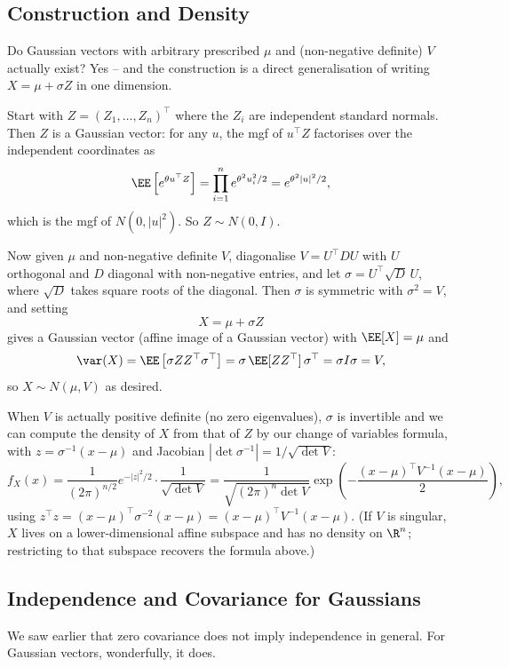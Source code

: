 \subsection{Construction and Density}

Do Gaussian vectors with arbitrary prescribed $\mu$ and (non-negative definite) $V$ actually exist? Yes -- and the construction is a direct generalisation of writing $X = \mu + \sigma Z$ in one dimension.

Start with $Z = (Z_1, \dots, Z_n)^\top$ where the $Z_i$ are independent standard normals. Then $Z$ is a Gaussian vector: for any $u$, the mgf of $u^\top Z$ factorises over the independent coordinates as
$$
\EE\left[e^{\theta u^\top Z}\right] = \prod_{i = 1}^{n} e^{\theta^2 u_i^2 / 2} = e^{\theta^2 |u|^2/2},
$$
which is the mgf of $N(0, |u|^2)$. So $Z \sim N(0, I)$.

Now given $\mu$ and non-negative definite $V$, diagonalise $V = U^\top D U$ with $U$ orthogonal and $D$ diagonal with non-negative entries, and let $\sigma = U^\top \sqrt{D}\, U$, where $\sqrt{D}$ takes square roots of the diagonal. Then $\sigma$ is symmetric with $\sigma^2 = V$, and setting
$$
X = \mu + \sigma Z
$$
gives a Gaussian vector (affine image of a Gaussian vector) with $\EE[X] = \mu$ and
$$
\var(X) = \EE\left[\sigma Z Z^\top \sigma^\top\right] = \sigma\, \EE[ZZ^\top]\, \sigma^\top = \sigma I \sigma = V,
$$
so $X \sim N(\mu, V)$ as desired.

When $V$ is actually positive definite (no zero eigenvalues), $\sigma$ is invertible and we can compute the density of $X$ from that of $Z$ by our change of variables formula, with $z = \sigma^{-1}(x - \mu)$ and Jacobian $|\det \sigma^{-1}| = 1/\sqrt{\det V}$:
$$
f_X(x) = \frac{1}{(2\pi)^{n/2}}e^{-|z|^2/2}\cdot\frac{1}{\sqrt{\det V}} = \frac{1}{\sqrt{(2\pi)^n \det V}}\exp\left(-\frac{(x - \mu)^\top V^{-1}(x - \mu)}{2}\right),
$$
using $z^\top z = (x - \mu)^\top \sigma^{-2}(x - \mu) = (x - \mu)^\top V^{-1}(x-\mu)$. (If $V$ is singular, $X$ lives on a lower-dimensional affine subspace and has no density on $\R^n$; restricting to that subspace recovers the formula above.)

\subsection{Independence and Covariance for Gaussians}

We saw earlier that zero covariance does not imply independence in general. For Gaussian vectors, wonderfully, it does.

